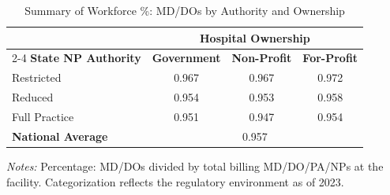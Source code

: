 \begin{table}[htbp]
    \centering
    \caption{Summary of Workforce \%: MD/DOs by Authority and Ownership}
    \label{tab:pct_md_own}
    \vspace{0.2cm}
    \begin{tabular}{lccc}
        \toprule
        & \multicolumn{3}{c}{\textbf{Hospital Ownership}} \\
        \cmidrule(lr){2-4}
        \textbf{State NP Authority} & \textbf{Government} & \textbf{Non-Profit} & \textbf{For-Profit} \\
        \midrule
        Restricted & 0.967 & 0.967 & 0.972 \\
        Reduced & 0.954 & 0.953 & 0.958 \\
        Full Practice & 0.951 & 0.947 & 0.954 \\
        \midrule
        \textbf{National Average} & \multicolumn{3}{c}{0.957} \\
        \bottomrule
    \end{tabular}
    \vspace{0.1cm}
    \begin{minipage}{0.85\textwidth}
        \footnotesize \textit{Notes:} Percentage: MD/DOs divided by total billing MD/DO/PA/NPs at the facility. Categorization reflects the regulatory environment as of 2023.
    \end{minipage}
\end{table}